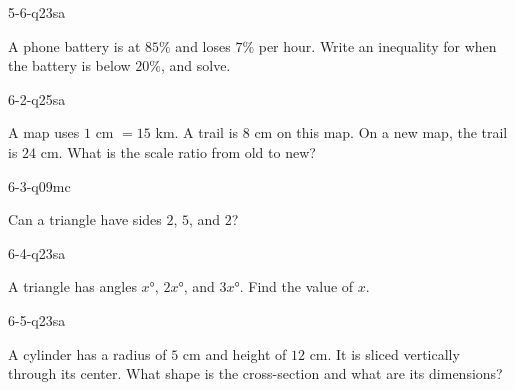 \begin{practiceQuestion}{5-6-q23}{sa}
\begin{questionText}
A phone battery is at $85\%$ and loses $7\%$ per hour. Write an inequality for when the battery is below $20\%$, and solve.
\end{questionText}
\end{practiceQuestion}

\begin{practiceQuestion}{6-2-q25}{sa}
\begin{questionText}
A map uses $1$ cm $= 15$ km. A trail is $8$ cm on this map. On a new map, the trail is $24$ cm. What is the scale ratio from old to new?
\end{questionText}
\end{practiceQuestion}

\begin{practiceQuestion}{6-3-q09}{mc}
\begin{questionText}
Can a triangle have sides $2$, $5$, and $2$?
\end{questionText}
\end{practiceQuestion}

\begin{practiceQuestion}{6-4-q23}{sa}
\begin{questionText}
A triangle has angles $x°$, $2x°$, and $3x°$. Find the value of $x$.
\end{questionText}
\end{practiceQuestion}

\begin{practiceQuestion}{6-5-q23}{sa}
\begin{questionText}
A cylinder has a radius of $5$ cm and height of $12$ cm. It is sliced vertically through its center. What shape is the cross-section and what are its dimensions?
\end{questionText}
\end{practiceQuestion}

